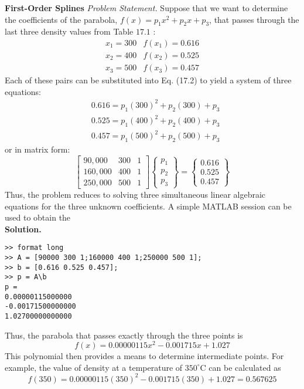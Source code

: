 \documentclass[../main.tex]{subfiles}
\begin{document}
        \begin{exmp} \textbf{First-Order Splines}
            \noindent\textit{Problem Statement.} Suppose that we want to determine the coefficients of the parabola, $f(x)=p_{1} x^{2}+p_{2} x+p_{3}$, that passes through the last three density values from Table $17.1$ :
            $$
            \begin{array}{ll}
            x_{1}=300 & f\left(x_{1}\right)=0.616 \\
            x_{2}=400 & f\left(x_{2}\right)=0.525 \\
            x_{3}=500 & f\left(x_{3}\right)=0.457
            \end{array}
            $$
            Each of these pairs can be substituted into Eq. (17.2) to yield a system of three equations:
            $$
            \begin{aligned}
            &0.616=p_{1}(300)^{2}+p_{2}(300)+p_{3} \\
            &0.525=p_{1}(400)^{2}+p_{2}(400)+p_{3} \\
            &0.457=p_{1}(500)^{2}+p_{2}(500)+p_{3}
            \end{aligned}
            $$
            or in matrix form:
            $$
            \left[\begin{array}{rrr}
            90,000 & 300 & 1 \\
            160,000 & 400 & 1 \\
            250,000 & 500 & 1
            \end{array}\right]\left\{\begin{array}{l}
            p_{1} \\
            p_{2} \\
            p_{3}
            \end{array}\right\}=\left\{\begin{array}{l}
            0.616 \\
            0.525 \\
            0.457
            \end{array}\right\}
            $$
            Thus, the problem reduces to solving three simultaneous linear algebraic equations for the three unknown coefficients. A simple MATLAB session can be used to obtain the
            \\\noindent \textbf{Solution.}
            \begin{lstlisting}[numbers=none]
>> format long
>> A = [90000 300 1;160000 400 1;250000 500 1];
>> b = [0.616 0.525 0.457];
>> p = A\b
p =
0.00000115000000
-0.00171500000000
1.02700000000000
            \end{lstlisting}

        Thus, the parabola that passes exactly through the three points is
        $$
        f(x)=0.00000115 x^{2}-0.001715 x+1.027
        $$
        This polynomial then provides a means to determine intermediate points. For example, the value of density at a temperature of $350^{\circ} \mathrm{C}$ can be calculated as
        $$
        f(350)=0.00000115(350)^{2}-0.001715(350)+1.027=0.567625
        $$
        
        \end{exmp}
\end{document}
